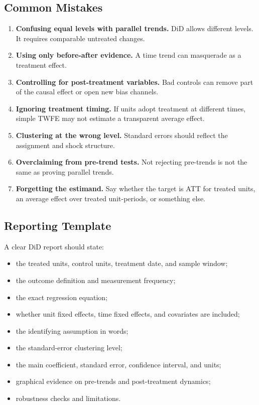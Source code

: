 \subsection{Common Mistakes}

\begin{enumerate}
    \item \textbf{Confusing equal levels with parallel trends.} DiD allows
    different levels. It requires comparable untreated changes.
    \item \textbf{Using only before-after evidence.} A time trend can masquerade
    as a treatment effect.
    \item \textbf{Controlling for post-treatment variables.} Bad controls can
    remove part of the causal effect or open new bias channels.
    \item \textbf{Ignoring treatment timing.} If units adopt treatment at
    different times, simple TWFE may not estimate a transparent average effect.
    \item \textbf{Clustering at the wrong level.} Standard errors should reflect
    the assignment and shock structure.
    \item \textbf{Overclaiming from pre-trend tests.} Not rejecting pre-trends is
    not the same as proving parallel trends.
    \item \textbf{Forgetting the estimand.} Say whether the target is ATT for
    treated units, an average effect over treated unit-periods, or something
    else.
\end{enumerate}

\subsection{Reporting Template}

A clear DiD report should state:
\begin{itemize}
    \item the treated units, control units, treatment date, and sample window;
    \item the outcome definition and measurement frequency;
    \item the exact regression equation;
    \item whether unit fixed effects, time fixed effects, and covariates are
    included;
    \item the identifying assumption in words;
    \item the standard-error clustering level;
    \item the main coefficient, standard error, confidence interval, and units;
    \item graphical evidence on pre-trends and post-treatment dynamics;
    \item robustness checks and limitations.
\end{itemize}


